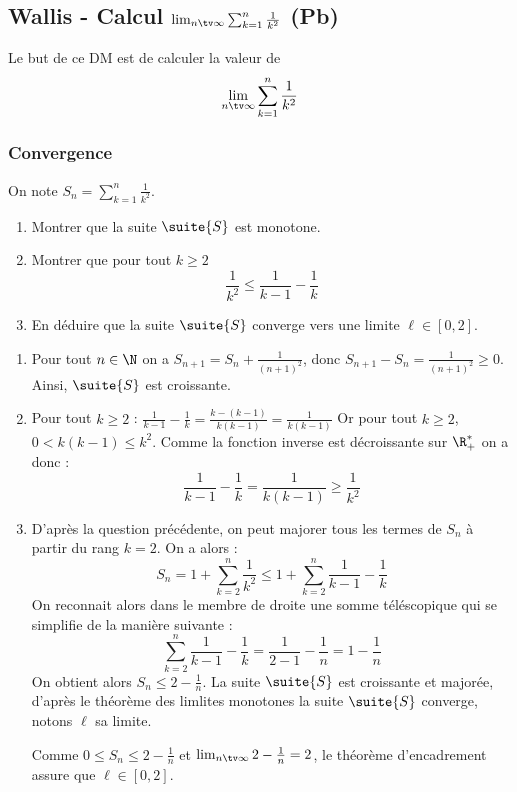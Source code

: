 \subsection{Wallis  - Calcul $\lim_{n\tv \infty} \sum_{k=1}^n \frac{1}{k^2}$ (Pb)}


Le but de ce DM est de calculer la valeur de 
$$\lim_{n\tv \infty} \sum_{k=1}^n \frac{1}{k^2}$$

\subsubsection{Convergence}
On note $S_n=  \sum_{k=1}^n \frac{1}{k^2}$.

\begin{enumerate}
\item Montrer que la suite $\suite{S}$  est monotone. 
\item Montrer que pour tout $k\geq 2$
$$\frac{1}{k^2} \leq \frac{1}{k-1}-\frac{1}{k}$$
\item En déduire que la suite $\suite{S}$ converge vers une limite $\ell \in [0,2]$. 
\end{enumerate}

\begin{correction}
\begin{enumerate}
\item Pour tout $n\in \N$ on a  $S_{n+1} = S_n + \frac{1}{(n+1)^2}$, donc 
$S_{n+1}-S_n = \frac{1}{(n+1)^2}\geq 0$. Ainsi, $\suite{S}$ est croissante. 
\item Pour tout $k\geq 2$ : $\frac{1}{k-1}-\frac{1}{k}= \frac{k-(k-1)}{k(k-1)}= \frac{1}{k(k-1)}$
Or pour tout $k\geq 2$,  $0<k(k-1) \leq k^2$. Comme la fonction inverse est décroissante sur $\R_+^*$ on a donc : 
$$\frac{1}{k-1}-\frac{1}{k}=\frac{1}{k(k-1)}\geq \frac{1}{k^2}$$

\item  D'après la question précédente, on peut majorer tous les termes de $S_n$ à partir du rang $k=2$. On  a alors : 
$$S_n = 1+ \sum_{k=2}^n\frac{1}{k^2} \leq 1 + \sum_{k=2}^n\frac{1}{k-1} -\frac{1}{k}$$
On reconnait alors dans le  membre de droite une somme téléscopique qui se simplifie de la manière suivante : 
$$\sum_{k=2}^n\frac{1}{k-1} -\frac{1}{k} = \frac{1}{2-1} -\frac{1}{n} = 1-\frac{1}{n}$$
On obtient alors $S_n  \leq 2-\frac{1}{n}$. 
La suite $\suite{S}$ est croissante et majorée, d'après le théorème des limlites monotones la suite $\suite{S}$ converge, notons $\ell$ sa limite. 

Comme $0\leq S_n\leq 2-\frac{1}{n}$ et $\lim_{n\tv \infty} 2-\frac{1}{n}=2$, le théorème d'encadrement assure que $\ell\in [0,2]$. 
 


\end{enumerate}
\end{correction}



